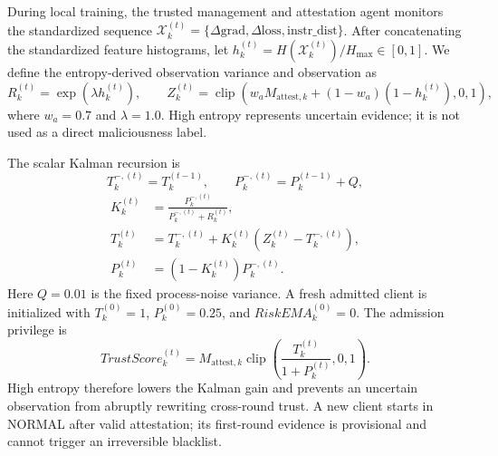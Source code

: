 \documentclass[11pt, a4paper]{article}
\begin{document}
During local training, the trusted management and attestation agent monitors
the standardized sequence
$\mathcal{X}_k^{(t)}=\{\Delta\mathrm{grad},\Delta\mathrm{loss},
\mathrm{instr\_dist}\}$. After concatenating the standardized feature
histograms, let $h_k^{(t)}=H(\mathcal{X}_k^{(t)})/H_{\max}\in[0,1]$. We define
the entropy-derived observation variance and observation as
\begin{equation}
    R_k^{(t)}=\exp(\lambda h_k^{(t)}),\qquad
    Z_k^{(t)}=\operatorname{clip}\!\left(
    w_aM_{\mathrm{attest},k}+(1-w_a)(1-h_k^{(t)}),0,1\right),
\end{equation}
where $w_a=0.7$ and $\lambda=1.0$. High entropy represents uncertain evidence;
it is not used as a direct maliciousness label.

The scalar Kalman recursion is
\begin{equation}
    T_k^{-,(t)}=T_k^{(t-1)},\qquad P_k^{-,(t)}=P_k^{(t-1)}+Q,
\end{equation}
\begin{equation}
\begin{aligned}
    K_k^{(t)}&=\frac{P_k^{-,(t)}}{P_k^{-,(t)}+R_k^{(t)}},\\
    T_k^{(t)}&=T_k^{-,(t)}+K_k^{(t)}
        \left(Z_k^{(t)}-T_k^{-,(t)}\right),\\
    P_k^{(t)}&=(1-K_k^{(t)})P_k^{-,(t)}.
\end{aligned}
\end{equation}
Here $Q=0.01$ is the fixed process-noise variance. A fresh admitted client is
initialized with $T_k^{(0)}=1$, $P_k^{(0)}=0.25$, and
$RiskEMA_k^{(0)}=0$. The admission privilege is
\begin{equation}
    TrustScore_k^{(t)}=M_{\mathrm{attest},k}
    \operatorname{clip}\!\left(\frac{T_k^{(t)}}{1+P_k^{(t)}},0,1\right).
\end{equation}
High entropy therefore lowers the Kalman gain and prevents an uncertain
observation from abruptly rewriting cross-round trust. A new client starts in
NORMAL after valid attestation; its first-round evidence is provisional and
cannot trigger an irreversible blacklist.
\end{document}
